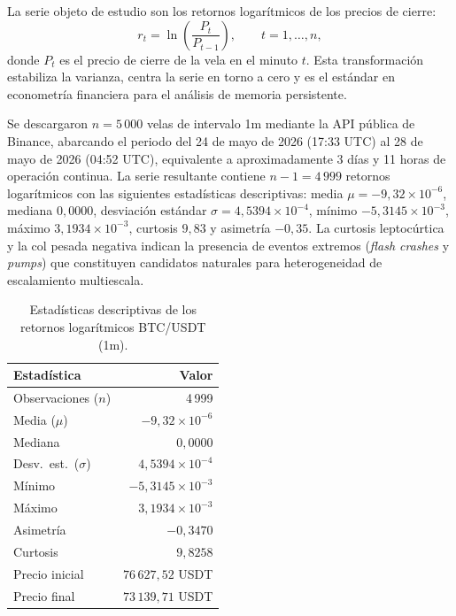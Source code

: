 La serie objeto de estudio son los retornos logarítmicos de los precios de
cierre:
\begin{equation}
    r_t = \ln\!\left(\frac{P_t}{P_{t-1}}\right),
    \qquad t = 1, \dots, n,
\end{equation}
donde $P_t$ es el precio de cierre de la vela en el minuto $t$.
Esta transformación estabiliza la varianza, centra la serie en torno a
cero y es el estándar en econometría financiera para el análisis de
memoria persistente.

Se descargaron $n = 5\,000$ velas de intervalo 1m mediante la API pública
de Binance, abarcando el periodo del 24 de mayo de 2026 (17:33 UTC) al
28 de mayo de 2026 (04:52 UTC), equivalente a aproximadamente 3 días y
11 horas de operación continua. La serie resultante contiene $n-1 = 4\,999$
retornos logarítmicos con las siguientes estadísticas descriptivas:
media $\mu = -9{,}32 \times 10^{-6}$, mediana $0{,}0000$,
desviación estándar $\sigma = 4{,}5394 \times 10^{-4}$,
mínimo $-5{,}3145 \times 10^{-3}$, máximo $3{,}1934 \times 10^{-3}$,
curtosis $9{,}83$ y asimetría $-0{,}35$. La curtosis leptocúrtica y la
col pesada negativa indican la presencia de eventos extremos (\textit{flash
crashes} y \textit{pumps}) que constituyen candidatos naturales para
heterogeneidad de escalamiento multiescala.

\begin{table}[H]
    \centering
    \caption{Estadísticas descriptivas de los retornos logarítmicos
             BTC/USDT (1m).}
    \label{tab:btc-stats}
    \begin{tabular}{@{}lr@{}}
        \toprule
        \textbf{Estadística} & \textbf{Valor} \\
        \midrule
        Observaciones ($n$) & 4\,999 \\
        Media ($\mu$) & $-9{,}32 \times 10^{-6}$ \\
        Mediana & $0{,}0000$ \\
        Desv.~est.~($\sigma$) & $4{,}5394 \times 10^{-4}$ \\
        Mínimo & $-5{,}3145 \times 10^{-3}$ \\
        Máximo & $3{,}1934 \times 10^{-3}$ \\
        Asimetría & $-0{,}3470$ \\
        Curtosis & $9{,}8258$ \\
        Precio inicial & $76\,627{,}52$ USDT \\
        Precio final & $73\,139{,}71$ USDT \\
        \bottomrule
    \end{tabular}
\end{table}

